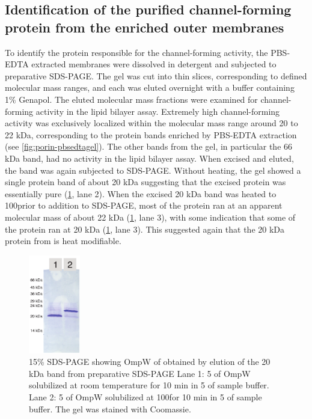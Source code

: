 \subsection{Identification of the purified channel-forming protein from the enriched outer membranes} 
To identify the protein responsible for the channel-forming activity, the \ac{PBS}-\ac{EDTA} extracted membranes were dissolved in detergent and subjected to preparative \ac{SDS-PAGE}. The gel was cut into thin slices, corresponding to defined molecular mass ranges, and each was eluted overnight with a buffer containing 1\% Genapol. The eluted molecular mass fractions were examined for channel-forming activity in the lipid bilayer assay. Extremely high channel-forming activity was exclusively localized within the molecular mass range around 20 to 22 kDa, corresponding to the protein bands enriched by \ac{PBS}-\ac{EDTA} extraction (see \cref{fig:porin-pbsedtagel}). The other bands from the gel, in particular the 66 kDa band, had no activity in the lipid bilayer assay. When excised and eluted, the band was again subjected to \ac{SDS-PAGE}. Without heating, the gel showed a single protein band of about 20 kDa suggesting that the excised protein was essentially pure (\cref{fig:porin-elutedband}, lane 2). When the excised 20 kDa band was heated to 100\cel prior to addition to \ac{SDS-PAGE}, most of the protein ran at an apparent molecular mass of about 22 kDa (\cref{fig:porin-elutedband}, lane 3), with some indication that some of the protein ran at 20 kDa (\cref{fig:porin-elutedband}, lane 3). This suggested again that the 20 kDa protein from \caulobacter is heat modifiable.

\begin{figure}[htb]
  	\begin{center}
   		\includegraphics[width=0.2\textwidth]{porin_chapter/img/Fig3-gelpurif.pdf}
   	\end{center}
   	\caption[\ac{SDS-PAGE} showing OmpW from \caulobacter obtained by elution of the 20 kDa band]{
15\% \ac{SDS-PAGE} showing OmpW of \caulobacter obtained by elution of the 20 kDa band from preparative \ac{SDS-PAGE} Lane 1: 5 \microgram of OmpW solubilized at room temperature for 10 min in 5 \microlitre of sample buffer. Lane 2: 5 \microgram of OmpW solubilized at 100\cel for 10 min in 5 \microlitre of sample buffer. The gel was stained with Coomassie.
   	}
   	\label{fig:porin-elutedband}
\end{figure}   

